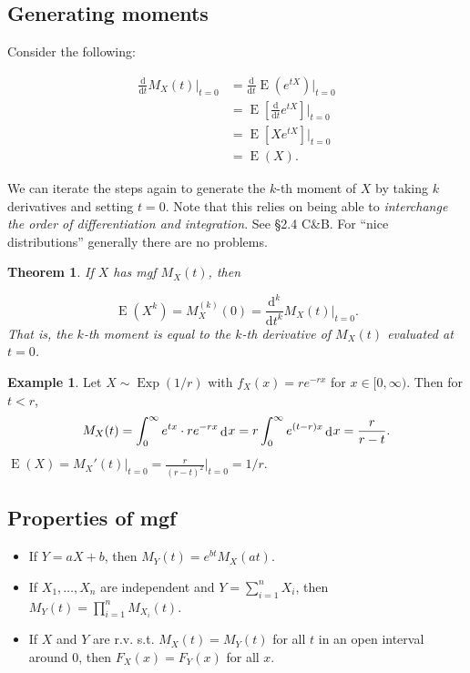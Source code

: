 \documentclass[
]{book}
\providecommand{\tightlist}{%
  \setlength{\itemsep}{0pt}\setlength{\parskip}{0pt}}
\DeclareMathOperator{\E}{E}
\DeclareMathOperator{\Exp}{Exp}
\DeclareMathOperator{\dd}{d}
\newcommand{\dint}{\dd\hspace{0.5pt}\!}
\newcommand{\ddif}{\text{d}}
\newtheorem{theorem}{Theorem}[chapter]
\theoremstyle{definition}
\theoremstyle{definition}
\newtheorem{example}{Example}[chapter]
\theoremstyle{definition}
\theoremstyle{definition}
\theoremstyle{remark}
\begin{document}
\hypertarget{generating-moments}{%
\subsection{Generating moments}\label{generating-moments}}

Consider the following:

\begin{align*}
\frac{\ddif}{\ddif t}M_X(t) \bigg|_{t=0}
&= \frac{\ddif}{\ddif t}  \E(e^{tX}) \bigg|_{t=0} \\
&=  \E\left[  \frac{\ddif}{\ddif t}e^{tX} \right]\bigg|_{t=0} \\
&= \E[Xe^{tX}] \Big|_{t=0} \\ 
&= \E(X).
\end{align*}

We can iterate the steps again to generate the \(k\)-th moment of \(X\) by taking \(k\) derivatives and setting \(t=0\). Note that this relies on being able to \emph{interchange the order of differentiation and integration}. See §2.4 C\&B. For ``nice distributions'' generally there are no problems.

\begin{theorem}
If \(X\) has mgf \(M_X(t)\), then

\[
\E(X^k) = M_X^{(k)}(0) = \frac{\ddif^k}{\ddif t^k}M_X(t) \bigg|_{t=0}.
\]
That is, the \(k\)-th moment is equal to the \(k\)-th derivative of \(M_X(t)\) evaluated at \(t=0\).
\end{theorem}

\begin{example}
Let \(X\sim\Exp(1/r)\) with \(f_X(x)=r e^{-r x}\) for \(x\in[0,\infty)\). Then for \(t<r\),
\[
M_X(t) = \int_0^\infty e^{tx}\cdot r e^{- r x} \dint x = r \int_0^\infty e^{(t- r)x} \dint x = \frac{ r}{ r-  t}.
\]
\(\E(X)=M_X'(t)\big|_{t=0}=\frac{r}{(r-t)^2}\Big|_{t=0}=1/r\).
\end{example}

\hypertarget{properties-of-mgf}{%
\subsection{Properties of mgf}\label{properties-of-mgf}}

\begin{itemize}
\tightlist
\item
  If \(Y=aX+b\), then \(M_Y(t)=e^{bt}M_X(at)\).
\item
  If \(X_1,\dots,X_n\) are independent and \(Y=\sum_{i=1}^n X_i\), then \(M_Y(t)=\prod_{i=1}^n M_{X_i}(t)\).
\item
  If \(X\) and \(Y\) are r.v. s.t. \(M_X(t)=M_Y(t)\) for all \(t\) in an open interval around 0, then \(F_X(x)=F_Y(x)\) for all \(x\).
\end{itemize}
\end{document}
